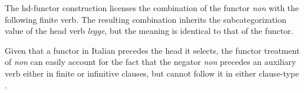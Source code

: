 \documentclass[output=paper]{langsci/langscibook}
\begin{document}
\be
\ex {}
\ee

%
\noindent
The {\sc hd-functor construction} licenses the combination
of the functor {\it non} with the following finite verb. The resulting combination inherits the subcategorization value of the head
verb {\it legge}, but the meaning is identical
to that of the functor.

Given that a functor in Italian precedes the head it selects,
the functor treatment of {\it non} can easily account for the
fact that the negator {\it non} precedes an auxiliary
verb either in finite or infinitive clauses, but cannot
follow it in either clause-type .




\be
\ex \begin{xlist}
\end{xlist}
\ee
\end{document}
